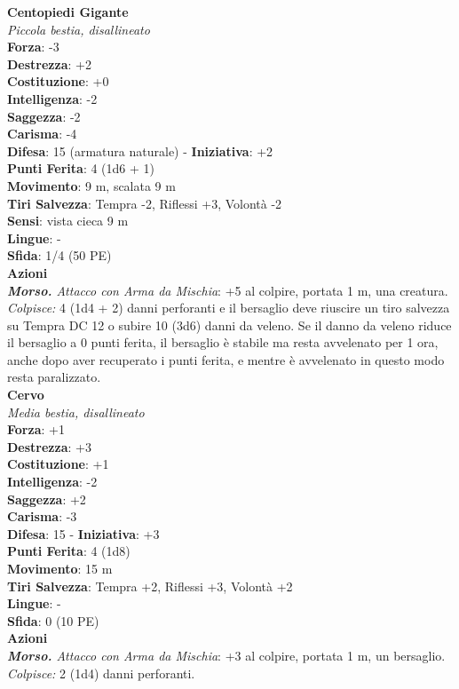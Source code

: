 \begin{multicols}{2}
\medskip\textbf{Centopiedi Gigante}\\
\emph{Piccola bestia, disallineato}\\
\textbf{Forza}: -3\\
\textbf{Destrezza}: +2\\
\textbf{Costituzione}: +0\\
\textbf{Intelligenza}: -2\\
\textbf{Saggezza}: -2\\
\textbf{Carisma}: -4\\
\textbf{Difesa}: 15 (armatura naturale) - \textbf{Iniziativa}: +2\\
\textbf{Punti Ferita}: 4 (1d6 + 1)\\
\textbf{Movimento}: 9 m, scalata 9 m\\
\textbf{Tiri Salvezza}: Tempra -2, Riflessi +3, Volontà -2 \\
\textbf{Sensi}: vista cieca 9 m\\
\textbf{Lingue}: -\\
\textbf{Sfida}: 1/4 (50 PE)\smallskip\\
\smallskip\textbf{Azioni}\\
\emph{\textbf{Morso.} Attacco con Arma da Mischia}: +5 al colpire, portata 1 m, una creatura.\\
\emph{Colpisce:} 4 (1d4 + 2) danni perforanti e il bersaglio deve riuscire un tiro salvezza su Tempra DC  12 o subire 10 (3d6) danni da veleno. Se il danno da veleno riduce il bersaglio a 0 punti ferita, il bersaglio è stabile ma resta avvelenato per 1 ora, anche dopo aver recuperato i punti ferita, e mentre è avvelenato in questo modo resta paralizzato.\\

\medskip\textbf{Cervo}\\
\emph{Media bestia, disallineato}\\
\textbf{Forza}: +1\\
\textbf{Destrezza}: +3\\
\textbf{Costituzione}: +1\\
\textbf{Intelligenza}: -2\\
\textbf{Saggezza}: +2\\
\textbf{Carisma}: -3\\
\textbf{Difesa}: 15 - \textbf{Iniziativa}: +3\\
\textbf{Punti Ferita}: 4 (1d8)\\
\textbf{Movimento}: 15 m\\
\textbf{Tiri Salvezza}: Tempra +2, Riflessi +3, Volontà +2 \\
\textbf{Lingue}: -\\
\textbf{Sfida}: 0 (10 PE)\smallskip\\
\smallskip\textbf{Azioni}\\
\emph{\textbf{Morso.} Attacco con Arma da Mischia}: +3 al colpire, portata 1 m, un bersaglio.\\
\emph{Colpisce:} 2 (1d4) danni perforanti.\\


\end{multicols}
